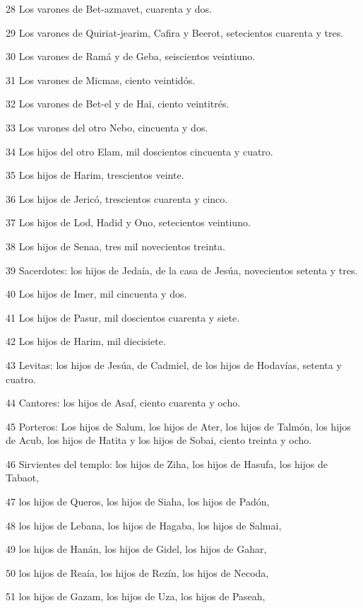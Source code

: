 \par 28 Los varones de Bet-azmavet, cuarenta y dos.
\par 29 Los varones de Quiriat-jearim, Cafira y Beerot, setecientos cuarenta y tres.
\par 30 Los varones de Ramá y de Geba, seiscientos veintiuno.
\par 31 Los varones de Micmas, ciento veintidós.
\par 32 Los varones de Bet-el y de Hai, ciento veintitrés.
\par 33 Los varones del otro Nebo, cincuenta y dos.
\par 34 Los hijos del otro Elam, mil doscientos cincuenta y cuatro.
\par 35 Los hijos de Harim, trescientos veinte.
\par 36 Los hijos de Jericó, trescientos cuarenta y cinco.
\par 37 Los hijos de Lod, Hadid y Ono, setecientos veintiuno.
\par 38 Los hijos de Senaa, tres mil novecientos treinta.
\par 39 Sacerdotes: los hijos de Jedaía, de la casa de Jesúa, novecientos setenta y tres.
\par 40 Los hijos de Imer, mil cincuenta y dos. 
\par 41 Los hijos de Pasur, mil doscientos cuarenta y siete.
\par 42 Los hijos de Harim, mil diecisiete.
\par 43 Levitas: los hijos de Jesúa, de Cadmiel, de los hijos de Hodavías, setenta y cuatro.
\par 44 Cantores: los hijos de Asaf, ciento cuarenta y ocho.
\par 45 Porteros: Los hijos de Salum, los hijos de Ater, los hijos de Talmón, los hijos de Acub, los hijos de Hatita y los hijos de Sobai, ciento treinta y ocho.
\par 46 Sirvientes del templo: los hijos de Ziha, los hijos de Hasufa, los hijos de Tabaot,
\par 47 los hijos de Queros, los hijos de Siaha, los hijos de Padón,
\par 48 los hijos de Lebana, los hijos de Hagaba, los hijos de Salmai,
\par 49 los hijos de Hanán, los hijos de Gidel, los hijos de Gahar,
\par 50 los hijos de Reaía, los hijos de Rezín, los hijos de Necoda,
\par 51 los hijos de Gazam, los hijos de Uza, los hijos de Paseah,
